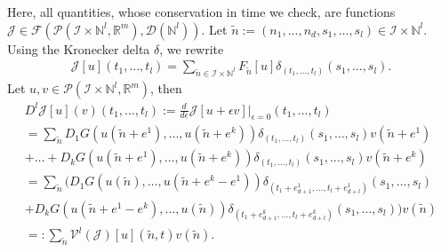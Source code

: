 \documentclass[runningheads]{llncs}
\newcommand{\Rr}{\mathbb{R}}
\newcommand{\Nn}{\mathbb{N}}
\newcommand{\1}{\chi}
\newcommand{\Ii}{\mathcal{I}}
\begin{document}
Here, all quantities, whose conservation in time we check, are functions $\mathcal{J}\in\mathcal{F}(\mathcal{P}(\Ii\times\Nn^l,\Rr^m),\mathcal{D}(\Nn^l))$. %
Let $\tilde{n}:=(n_1,\dots,n_d,s_1,\dots,s_l)\in\Ii\times\Nn^l$. Using the Kronecker delta $\delta$, we rewrite
\begin{gather*}
	\mathcal{J}[u](t_1,\ldots,t_{l})
	=\sum_{\tilde{n}\in\Ii\times\Nn^l}F_{\tilde{n}}[u]\delta_{(t_1,\ldots,t_{l})}(s_1,\ldots,s_l).
\end{gather*}
Let $u,v\in\mathcal{P}(\Ii\times\Nn^l,\Rr^m)$, then
\footnotesize
\begin{gather*}
	D^l\mathcal{J}[u](v)(t_1,\ldots,t_{l}):=\frac{d}{d\epsilon}\mathcal{J}[u+\epsilon v]\Big|_{\epsilon=0}(t_1,\ldots,t_{l})\\
	=\sum_{\tilde{n}}D_1G(u(\tilde{n}+e^1),\ldots,u(\tilde{n}+e^k))\delta_{(t_1,\ldots,t_{l})}(s_1,\ldots,s_l)v(\tilde{n}+e^1)\\
+\ldots
	+D_kG(u(\tilde{n}+e^1),\ldots,u(\tilde{n}+e^k))\delta_{(t_1,\ldots,t_{l})}(s_1,\ldots,s_l)v(\tilde{n}+e^k)\\
	=\sum_{\tilde{n}}\Big(D_1G(u(\tilde{n}),\ldots,u(\tilde{n}+e^k-e^1))\delta_{(t_1+e^1_{d+1},\ldots,t_{l}+e^1_{d+l})}(s_1,\ldots,s_l)\\
	+D_kG(u(\tilde{n}+e^1-e^k),\ldots,u(\tilde{n}))\delta_{(t_1+e^k_{d+1},\ldots,t_{l}+e^k_{d+l})}(s_1,\ldots,s_l)\Big)v(\tilde{n})\\
	=:\sum_{\tilde{n}}\mathcal{V}^l(\mathcal{J})[u](\tilde{n},t)v(\tilde{n}).
\end{gather*}
\end{document}
